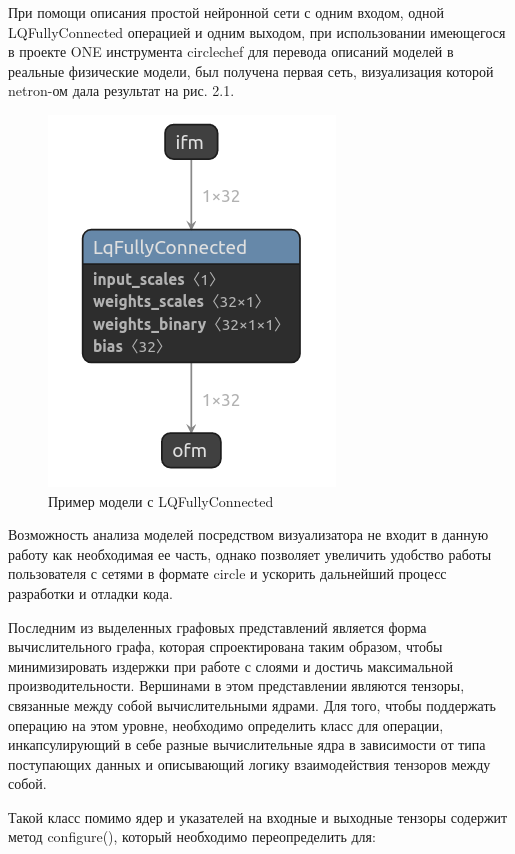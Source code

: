 При помощи описания простой нейронной сети с одним входом, одной LQFullyConnected операцией и одним выходом, при использовании имеющегося в проекте ONE инструмента circlechef для перевода описаний моделей в реальные физические модели, был получена первая сеть, визуализация которой netron-ом дала результат на рис. 2.1.

\begin{figure}[H]
    \begin{center}
        \includegraphics[scale=0.4]{tex/inc/img/lq.png}
        \caption{Пример модели с LQFullyConnected}
    \end{center}
\end{figure}

Возможность анализа моделей посредством визуализатора не входит в данную работу как необходимая ее часть, однако позволяет увеличить удобство работы пользователя с сетями в формате circle и ускорить дальнейший процесс разработки и отладки кода.

Последним из выделенных графовых представлений является форма вычислительного графа, которая спроектирована таким образом, чтобы минимизировать издержки при работе с слоями и достичь максимальной производительности. Вершинами в этом представлении являются тензоры, связанные между собой вычислительными ядрами. Для того, чтобы поддержать операцию на этом уровне, необходимо определить класс для операции, инкапсулирующий в себе разные вычислительные ядра в зависимости от типа поступающих данных и описывающий логику взаимодействия тензоров между собой.

Такой класс помимо ядер и указателей на входные и выходные тензоры содержит метод configure(), который необходимо переопределить для:

